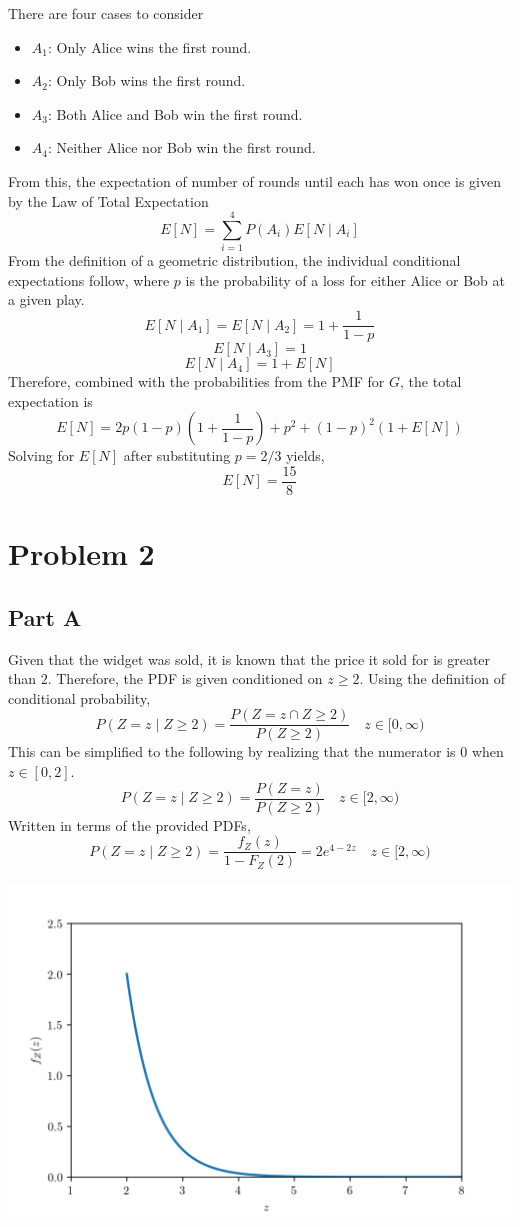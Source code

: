 \documentclass{article}
\begin{document}
There are four cases to consider
\begin{itemize}
  \item $A_1$: Only Alice wins the first round.
  \item $A_2$: Only Bob wins the first round.
  \item $A_3$: Both Alice and Bob win the first round.
  \item $A_4$: Neither Alice nor Bob win the first round.
\end{itemize}
From this, the expectation of number of rounds until each has won once is
given by the Law of Total Expectation
$$ E[N] = \sum_{i = 1}^4 P(A_i) E[N \mid A_i] $$
From the definition of a geometric distribution, the individual conditional
expectations follow, where $p$ is the probability of a loss for either Alice
or Bob at a given play.
$$ E[N \mid A_1] = E[N \mid A_2] = 1 + \frac{1}{1 - p} $$
$$ E[N \mid A_3] = 1 $$
$$ E[N \mid A_4] = 1 + E[N] $$
Therefore, combined with the probabilities from the PMF for $G$, the total
expectation is
$$ E[N] = 2 p (1 - p) \left(1 + \frac{1}{1 - p}\right) + p^2 + (1 - p)^2 (1 +
E[N]) $$
Solving for $E[N]$ after substituting $p = 2/3$ yields,
$$ E[N] = \frac{15}{8} $$

\section*{Problem 2}

\subsection*{Part A}

Given that the widget was sold, it is known that the price it sold for is
greater than $2$. Therefore, the PDF is given conditioned on $z \geq 2$.
Using the definition of conditional probability,
$$ P(Z = z \mid Z \geq 2) = \frac{P(Z = z \cap Z \geq 2)}{P(Z
\geq 2)} \quad z \in [0, \infty) $$
This can be simplified to the following by realizing that the numerator is
$0$ when $z \in [0, 2]$.
$$ P(Z = z \mid Z \geq 2) = \frac{P(Z = z)}{P(Z \geq 2)} \quad
z \in [2, \infty) $$
Written in terms of the provided PDFs,
$$ P(Z = z \mid Z \geq 2) = \frac{f_{Z}(z)}{1 - F_{Z}(2)} = 2
e^{4 - 2z} \quad z \in [2, \infty) $$

\begin{center}
    \includegraphics[scale=0.85]{Images/P2a.PNG}
\end{center}
\end{document}
